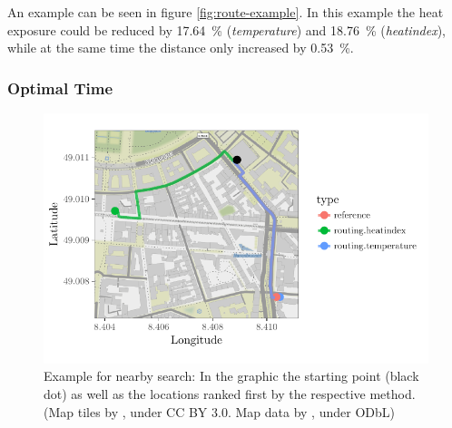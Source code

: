 
An example can be seen in figure \ref{fig:route-example}. In this example the heat exposure could be reduced by \SI{17.64}{\percent} (\emph{temperature}) and \SI{18.76}{\percent} (\emph{heatindex}), while at the same time the distance only increased by  \SI{0.53}{\percent}.

\subsubsection{Optimal Time}

\begin{figure}
	\centering
	\includegraphics[scale=0.9]{figures/optimaltime_route_example}
	\caption{Example for nearby search: In the graphic the starting point (black dot) as well as the locations ranked first by the respective method. (Map tiles by \textcite{Stamen2017}, under CC BY 3.0. Map data by \textcite{OSMF2016}, under ODbL)}
	\label{fig:optimaltime-route-example}
\end{figure}

